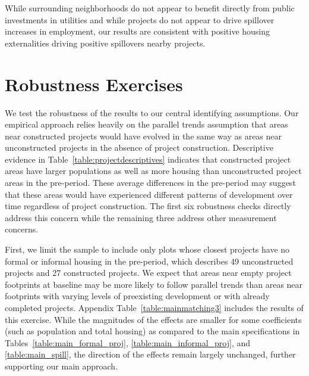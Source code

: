 \documentclass[12pt]{article}
\newcommand{\rv}{}
\begin{document}
\rv{While surrounding neighborhoods do not appear to benefit directly from public investments in utilities and while projects do not appear to drive spillover increases in employment, our results are consistent with positive housing externalities driving positive spillovers nearby projects.}

\section{Robustness Exercises}\label{section:robustness}

We test the robustness of the results to our central identifying assumptions.  Our empirical approach relies heavily on the parallel trends assumption that areas near constructed projects would have evolved in the same way as areas near unconstructed projects in the absence of project construction.  Descriptive evidence in Table~\ref{table:projectdescriptives} indicates that constructed project areas have larger populations as well as more housing than unconstructed project areas in the pre-period.  These average differences in the pre-period may suggest that these areas would have experienced different patterns of development over time regardless of project construction.  \rv{The first six robustness checks directly address this concern while the remaining three address other measurement concerns.}

First, we limit the sample to include only plots whose closest projects have no formal or informal housing in the pre-period, which describes 49 unconstructed projects and 27 constructed projects.  We expect that areas near empty project footprints at baseline may be more likely to follow parallel trends than areas near footprints with varying levels of preexisting development or with already completed projects.  Appendix Table~\ref{table:mainmatching3} includes the results of this exercise.  While the magnitudes of the effects are smaller for some coefficients (such as population and total housing) as compared to the main specifications in Tables~\ref{table:main_formal_proj}, \ref{table:main_informal_proj}, and \ref{table:main_spill}, the direction of the effects remain largely unchanged, further supporting our main approach.

\end{document}
